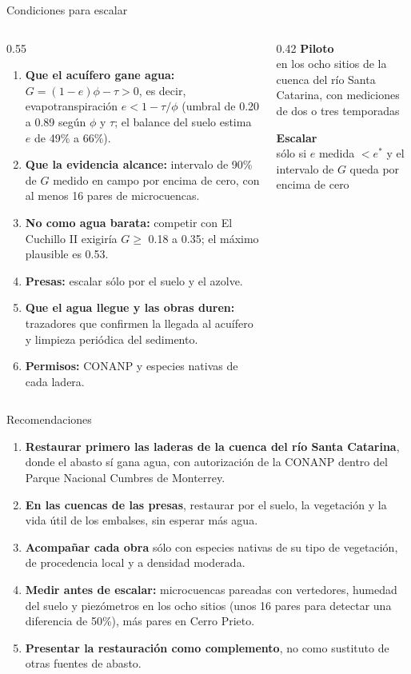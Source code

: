 \documentclass[aspectratio=169,10pt]{beamer}
\newcommand{\cifra}[2]{{\color{naranja}\fontsize{26}{28}\selectfont\bfseries #1}\\[2pt]{\small\color{gris}#2}}
\begin{document}
\begin{frame}{Condiciones para escalar}
\begin{columns}[T]
\begin{column}{0.55\textwidth}
\footnotesize
\begin{enumerate}
  \item \textbf{Que el acuífero gane agua:} $G=(1-e)\phi-\tau>0$, es decir, evapotranspiración $e<1-\tau/\phi$ (umbral de 0.20 a 0.89 según $\phi$ y $\tau$; el balance del suelo estima $e$ de 49\% a 66\%).
  \item \textbf{Que la evidencia alcance:} intervalo de 90\% de $G$ medido en campo por encima de cero, con al menos 16 pares de microcuencas.
  \item \textbf{No como agua barata:} competir con El Cuchillo II exigiría $G\ge$ 0.18 a 0.35; el máximo plausible es 0.53.
  \item \textbf{Presas:} escalar sólo por el suelo y el azolve.
  \item \textbf{Que el agua llegue y las obras duren:} trazadores que confirmen la llegada al acuífero y limpieza periódica del sedimento.
  \item \textbf{Permisos:} CONANP y especies nativas de cada ladera.
\end{enumerate}
\end{column}
\begin{column}{0.42\textwidth}
\centering
\cifra{Piloto}{en los ocho sitios de la cuenca del río Santa Catarina, con mediciones de dos o tres temporadas}
\vspace{0.4cm}

\cifra{Escalar}{sólo si $e$ medida $<e^\ast$ y el intervalo de $G$ queda por encima de cero}
\end{column}
\end{columns}
\end{frame}

\begin{frame}{Recomendaciones}
\begin{enumerate}
  \item \textbf{Restaurar primero las laderas de la cuenca del río Santa Catarina}, donde el abasto sí gana agua, con autorización de la CONANP dentro del Parque Nacional Cumbres de Monterrey.
  \item \textbf{En las cuencas de las presas}, restaurar por el suelo, la vegetación y la vida útil de los embalses, sin esperar más agua.
  \item \textbf{Acompañar cada obra} sólo con especies nativas de su tipo de vegetación, de procedencia local y a densidad moderada.
  \item \textbf{Medir antes de escalar:} microcuencas pareadas con vertedores, humedad del suelo y piezómetros en los ocho sitios (unos 16 pares para detectar una diferencia de 50\%), más pares en Cerro Prieto.
  \item \textbf{Presentar la restauración como complemento}, no como sustituto de otras fuentes de abasto.
\end{enumerate}
\end{frame}
\end{document}
